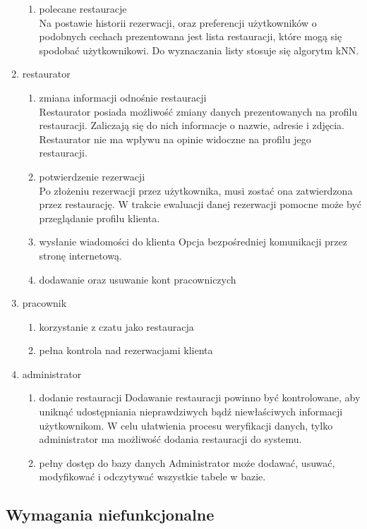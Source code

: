 \documentclass{article}
\begin{document}
\begin{enumerate}
\begin{enumerate}
	\item polecane restauracje \\
	Na postawie historii rezerwacji, oraz preferencji użytkowników o podobnych cechach prezentowana jest lista restauracji, które mogą się spodobać użytkownikowi. Do wyznaczania listy stosuje się algorytm kNN.
\end{enumerate}
\item restaurator
\begin{enumerate}
	\item zmiana informacji odnośnie restauracji \\
	Restaurator posiada możliwość zmiany danych prezentowanych na profilu restauracji. Zaliczają się do nich informacje o nazwie, adresie i zdjęcia. Restaurator nie ma wpływu na opinie widoczne na profilu jego restauracji.
	\item potwierdzenie rezerwacji \\
	Po złożeniu rezerwacji przez użytkownika, musi zostać ona zatwierdzona przez restaurację. W trakcie ewaluacji danej rezerwacji pomocne może być przeglądanie profilu klienta.
	\item wysłanie wiadomości do klienta
	Opcja bezpośredniej komunikacji przez stronę internetową.
	\item dodawanie oraz usuwanie kont pracowniczych
\end{enumerate}
\item pracownik
\begin{enumerate}
	\item korzystanie z czatu jako restauracja
	\item pełna kontrola nad rezerwacjami klienta
\end{enumerate}
\item administrator
\begin{enumerate}
	\item dodanie restauracji
	Dodawanie restauracji powinno być kontrolowane, aby uniknąć udostępniania nieprawdziwych bądź niewłaściwych informacji użytkownikom. W celu ułatwienia procesu weryfikacji danych, tylko administrator ma możliwość dodania restauracji do systemu.
	\item pełny dostęp do bazy danych
	Administrator może dodawać, usuwać, modyfikować i odczytywać wszystkie tabele w bazie. 
\end{enumerate}
\end{enumerate}


\subsection{Wymagania niefunkcjonalne}
\end{document}
